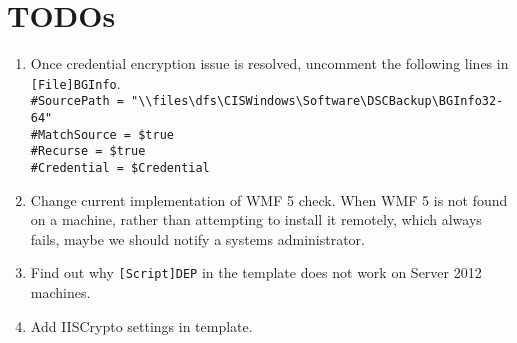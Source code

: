   \section{TODOs}
    \begin{enumerate}[label=(\roman*)]
      \item Once credential encryption issue is resolved, uncomment the following lines in \verb|[File]BGInfo|.\\
      \verb^#SourcePath = "\\files\dfs\CISWindows\Software\DSCBackup\BGInfo32-64"^\\
      \verb^#MatchSource = $true^\\
      \verb^#Recurse = $true^\\
      \verb^#Credential = $Credential^\\
      \item Change current implementation of WMF 5 check. When WMF 5 is not found on a machine, rather than attempting to install it remotely, which always fails, maybe we should notify a systems administrator.
      \item Find out why \verb|[Script]DEP| in the template does not work on Server 2012 machines.
      \item Add IISCrypto settings in template.
    \end{enumerate}